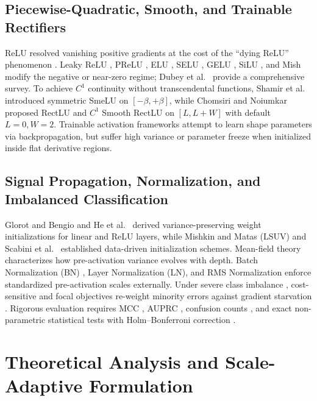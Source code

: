 \documentclass[11pt, a4paper]{article}
\begin{document}
\subsection{Piecewise-Quadratic, Smooth, and Trainable Rectifiers}
ReLU \cite{ref22, ref23} resolved vanishing positive gradients at the cost of the ``dying ReLU'' phenomenon \cite{ref24}. Leaky ReLU \cite{ref25}, PReLU \cite{ref26}, ELU \cite{ref17}, SELU \cite{ref27}, GELU \cite{ref16}, SiLU \cite{ref28}, and Mish \cite{ref29} modify the negative or near-zero regime; Dubey et al.\ \cite{ref30} provide a comprehensive survey. To achieve $C^{1}$ continuity without transcendental functions, Shamir et al.\ \cite{ref41} introduced symmetric SmeLU on $[-\beta, +\beta]$, while Chomsiri and Noiumkar \cite{ref15} proposed RectLU and $C^{1}$ Smooth RectLU on $[L, L+W]$ with default $L = 0, W = 2$. Trainable activation frameworks \cite{ref26, ref39} attempt to learn shape parameters via backpropagation, but suffer high variance or parameter freeze when initialized inside flat derivative regions.

\subsection{Signal Propagation, Normalization, and Imbalanced Classification}
Glorot and Bengio \cite{ref31} and He et al.\ \cite{ref26} derived variance-preserving weight initializations for linear and ReLU layers, while Mishkin and Matas \cite{ref32} (LSUV) and Scabini et al.\ \cite{ref40} established data-driven initialization schemes. Mean-field theory \cite{ref18, ref19, ref20} characterizes how pre-activation variance evolves with depth. Batch Normalization (BN) \cite{ref33}, Layer Normalization (LN), and RMS Normalization enforce standardized pre-activation scales externally. Under severe class imbalance \cite{ref13, ref14}, cost-sensitive and focal objectives \cite{ref21, ref42} re-weight minority errors against gradient starvation \cite{ref34}. Rigorous evaluation requires MCC \cite{ref8, ref9}, AUPRC \cite{ref10, ref11}, confusion counts \cite{ref12}, and exact non-parametric statistical tests with Holm--Bonferroni correction \cite{ref36}.

\section{Theoretical Analysis and Scale-Adaptive Formulation}
\end{document}

